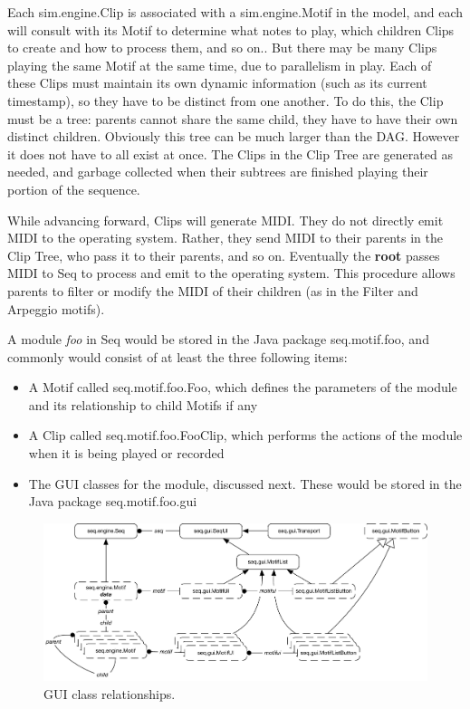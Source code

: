 \documentclass[twoside,10pt]{article}
\begin{document}
Each {\sf sim.engine.Clip} is associated with a {\sf sim.engine.Motif} in the model, and each will consult with its Motif to determine what notes to play, which children Clips to create and how to process them, and so on..  But there may be many Clips playing the same Motif at the same time, due to parallelism in play.  Each of these Clips must maintain its own dynamic information (such as its current timestamp), so they have to be distinct from one another.  To do this, the Clip must be a tree: parents cannot share the same child, they have to have their own distinct children.  Obviously this tree can be much larger than the DAG.  However it does not have to all exist at once.  The Clips in the Clip Tree are generated as needed, and garbage collected when their subtrees are finished playing their portion of the sequence.  

While advancing forward, Clips will generate MIDI.  They do not directly emit MIDI to the operating system.  Rather, they send MIDI to their parents in the Clip Tree, who pass it to their parents, and so on.  Eventually the {\bf root} passes MIDI to Seq to process and emit to the operating system.  This procedure allows parents to filter or modify the MIDI of their children (as in the Filter and Arpeggio motifs).

A module {\it foo} in Seq would be stored in the Java package {\sf seq.motif.foo}, and commonly would consist of at least the three following items:

\begin{itemize}
\item A Motif called {\sf seq.motif.foo.Foo}, which defines the parameters of the module and its relationship to child Motifs if any
\item A Clip called {\sf seq.motif.foo.FooClip}, which performs the actions of the module when it is being played or recorded
\item The GUI classes for the module, discussed next.  These would be stored in the Java package {\sf seq.motif.foo.gui}
\end{itemize}

\begin{figure}[t]
\centering
\includegraphics[width=5in]{gui}
\caption{GUI class relationships.}
\label{guidev}
\end{figure}
\end{document}
